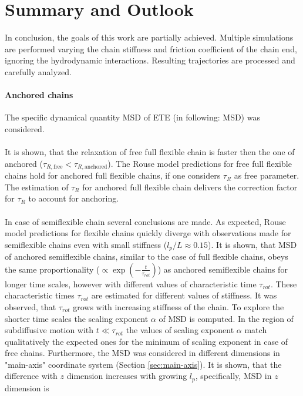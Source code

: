 \documentclass[
    paper=A4,pagesize=automedia,fontsize=12pt,
    BCOR=15mm,DIV=22,
    twoside,headinclude,footinclude=false,
    fleqn,             %
    bibliography=totocnumbered,          %
    listof=totoc,                %
    listof=flat,                 %
    cleardoublepage=empty      %
    numbers=endperiod
]{scrartcl}
\begin{document}
\section{Summary and Outlook}
In conclusion, the goals of this work are partially achieved. Multiple simulations 
are performed varying the chain stiffness and friction coefficient of the chain end, 
ignoring the hydrodynamic interactions. Resulting trajectories are processed and 
carefully analyzed. 

\paragraph{Anchored chains}
The specific dynamical quantity MSD of ETE (in following: MSD) was considered.
\\
\\
It is shown,
that the relaxation of free full flexible chain is faster then the one of
anchored ($\tau_{R,\text{free}} < \tau_{R,\text{anchored}}$). The Rouse model predictions
for free full flexible chains hold for anchored full flexible chains, if one considers
$\tau_R$ as free parameter. The estimation of $\tau_R$ for anchored full flexible chain 
delivers the correction factor for $\tau_R$ to account for anchoring.
\\
\\
In case of semiflexible chain several conclusions are made. As expected,
Rouse model predictions for flexible chains quickly diverge with observations made 
for semiflexible chains even with small stiffness ($l_p/L \approx 0.15$).
It is shown, that MSD of anchored semiflexible chains, 
similar to the case of full flexible chains, obeys the same 
proportionality ($\propto \exp\left(-\frac{t}{\tau_{rot}}\right)$) 
as anchored semiflexible chains for longer time scales, however with
different values of characteristic time $\tau_{rot}$. These characteristic times 
$\tau_{rot}$ are estimated for different values of stiffness. It was observed, that 
$\tau_{rot}$ grows with increasing stiffness of the chain. To explore the shorter time
scales the scaling exponent $\alpha$ of MSD is computed. In the region of subdiffusive 
motion with $t\ll\tau_{rot}$ the values of scaling exponent $\alpha$ match
qualitatively the expected ones for the minimum of scaling exponent in case of free chains.
Furthermore, the MSD was considered in different dimensions in "main-axis" coordinate 
system (Section \ref{sec:main-axis}). It is shown, that the difference with $z$ 
dimension increases with growing $l_p$, specifically, MSD in $z$ dimension is 
\end{document}
